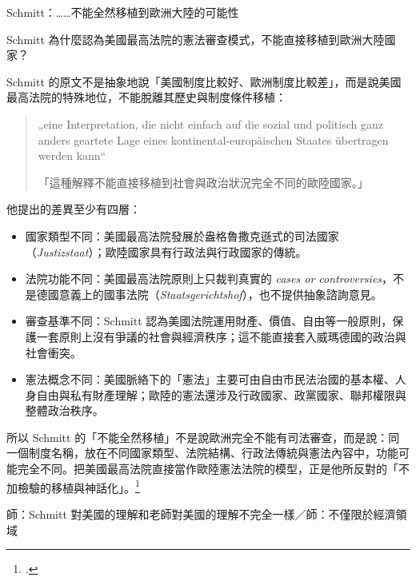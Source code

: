 
\begin{qaprompt}
Schmitt：\ldots\ldots 不能全然移植到歐洲大陸的可能性
\end{qaprompt}

\begin{qaquestion}
Schmitt 為什麼認為美國最高法院的憲法審查模式，不能直接移植到歐洲大陸國家？
\end{qaquestion}

Schmitt 的原文不是抽象地說「美國制度比較好、歐洲制度比較差」，而是說美國最高法院的特殊地位，不能脫離其歷史與制度條件移植：

\begin{quote}
„eine Interpretation, die nicht einfach auf die sozial und politisch ganz anders geartete Lage eines kontinental-europäischen Staates übertragen werden kann``

「這種解釋不能直接移植到社會與政治狀況完全不同的歐陸國家。」
\end{quote}

他提出的差異至少有四層：

\begin{itemize}
\tightlist
\item
  國家類型不同：美國最高法院發展於盎格魯撒克遜式的司法國家（\emph{Justizstaat}）；歐陸國家具有行政法與行政國家的傳統。
\item
  法院功能不同：美國最高法院原則上只裁判真實的 \emph{cases or controversies}，不是德國意義上的國事法院（\emph{Staatsgerichtshof}），也不提供抽象諮詢意見。
\item
  審查基準不同：Schmitt 認為美國法院運用財產、價值、自由等一般原則，保護一套原則上沒有爭議的社會與經濟秩序；這不能直接套入威瑪德國的政治與社會衝突。
\item
  憲法概念不同：美國脈絡下的「憲法」主要可由自由市民法治國的基本權、人身自由與私有財產理解；歐陸的憲法還涉及行政國家、政黨國家、聯邦權限與整體政治秩序。
\end{itemize}

所以 Schmitt 的「不能全然移植」不是說歐洲完全不能有司法審查，而是說：同一個制度名稱，放在不同國家類型、法院結構、行政法傳統與憲法內容中，功能可能完全不同。把美國最高法院直接當作歐陸憲法法院的模型，正是他所反對的「不加檢驗的移植與神話化」。\footcites[80--82]{schmitt2015}[12--14]{schmitt1931}


\begin{qaprompt}
師：Schmitt 對美國的理解和老師對美國的理解不完全一樣／師：不僅限於經濟領域
\end{qaprompt}


